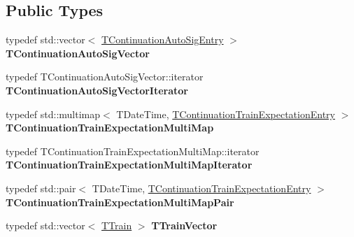 \subsection*{Public Types}
\begin{DoxyCompactItemize}
\item 
\mbox{\label{class_t_train_controller_a1908f7d1a5dcfebf2f747efbdd6f4681}} 
typedef std\+::vector$<$ \mbox{\hyperlink{class_t_train_controller_1_1_t_continuation_auto_sig_entry}{T\+Continuation\+Auto\+Sig\+Entry}} $>$ {\bfseries T\+Continuation\+Auto\+Sig\+Vector}
\item 
\mbox{\label{class_t_train_controller_a0c129f8836ec5be031f4163320ff3c0a}} 
typedef T\+Continuation\+Auto\+Sig\+Vector\+::iterator {\bfseries T\+Continuation\+Auto\+Sig\+Vector\+Iterator}
\item 
\mbox{\label{class_t_train_controller_a36525478ab0d9f59e486b8c030acd87c}} 
typedef std\+::multimap$<$ T\+Date\+Time, \mbox{\hyperlink{class_t_train_controller_1_1_t_continuation_train_expectation_entry}{T\+Continuation\+Train\+Expectation\+Entry}} $>$ {\bfseries T\+Continuation\+Train\+Expectation\+Multi\+Map}
\item 
\mbox{\label{class_t_train_controller_ad10dfce8ec2a66858af7fbeb1529257f}} 
typedef T\+Continuation\+Train\+Expectation\+Multi\+Map\+::iterator {\bfseries T\+Continuation\+Train\+Expectation\+Multi\+Map\+Iterator}
\item 
\mbox{\label{class_t_train_controller_a5adc75543948ea32915ef025ace798b2}} 
typedef std\+::pair$<$ T\+Date\+Time, \mbox{\hyperlink{class_t_train_controller_1_1_t_continuation_train_expectation_entry}{T\+Continuation\+Train\+Expectation\+Entry}} $>$ {\bfseries T\+Continuation\+Train\+Expectation\+Multi\+Map\+Pair}
\item 
\mbox{\label{class_t_train_controller_aa9073b97736a2733dbdaf8dc52e34c24}} 
typedef std\+::vector$<$ \mbox{\hyperlink{class_t_train}{T\+Train}} $>$ {\bfseries T\+Train\+Vector}
\end{DoxyCompactItemize}
